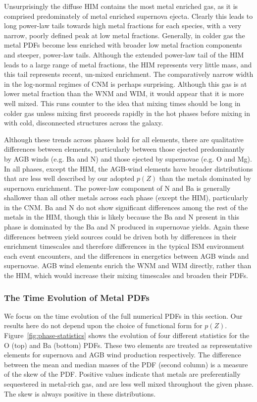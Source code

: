 \documentclass[twocolumn]{aastex61}
\begin{document}
Unsurprisingly the diffuse HIM contains the most metal enriched gas, as it is comprised predominately of metal enriched supernova ejecta. Clearly this leads to long power-law tails towards high metal fractions for each species, with a very narrow, poorly defined peak at low metal fractions. Generally, in colder gas the metal PDFs become less enriched with broader low metal fraction components and steeper, power-law tails. Although the extended power-law tail of the HIM leads to a large range of metal fractions, the HIM represents very little mass, and this tail represents recent, un-mixed enrichment. The comparatively narrow width in the log-normal regimes of CNM is perhaps surprising. Although this gas is at lower metal fraction than the WNM and WIM, it would appear that it is more well mixed. This runs counter to the idea that mixing times should be long in colder gas unless mixing first proceeds rapidly in the hot phases before mixing in with cold, disconnected structures across the galaxy. 

Although these trends across phases hold for all elements, there are qualitative differences between elements, particularly between those ejected predominantly by AGB winds (e.g. Ba and N) and those ejected by supernovae (e.g. O and Mg). In all phases, except the HIM, the AGB-wind elements have broader distributions that are less well described by our adopted $p(Z)$ than the metals dominated by supernova enrichment. The power-law component of N and Ba is generally shallower than all other metals across each phase (except the HIM), particularly in the CNM. Ba and N do not show significant differences among the rest of the metals in the HIM, though this is likely because the Ba and N present in this phase is dominated by the Ba and N produced in supernovae yields. Again these differences between yield sources could be driven both by differences in their enrichment timescales and therefore differences in the typical ISM environment each event encounters, and the differences in energetics between AGB winds and supernovae. AGB wind elements enrich the WNM and WIM directly, rather than the HIM, which would increase their mixing timescales and broaden their PDFs. 

\subsubsection{The Time Evolution of Metal PDFs}
\label{sec:statistics}
We focus on the time evolution of the full numerical PDFs in this section. Our results here do not depend upon the choice of functional form for $p(Z)$. Figure~\ref{fig:phase-statistics} shows the evolution of four different statistics for the O (top) and Ba (bottom) PDFs. These two elements are treated as representative elements for supernova and AGB wind production respectively. The difference between the mean and median masses of the PDF (second column) is a measure of the skew of the PDF. Positive values indicate that metals are preferentially sequestered in metal-rich gas, and are less well mixed throughout the given phase. The skew is always positive in these distributions.
\end{document}
